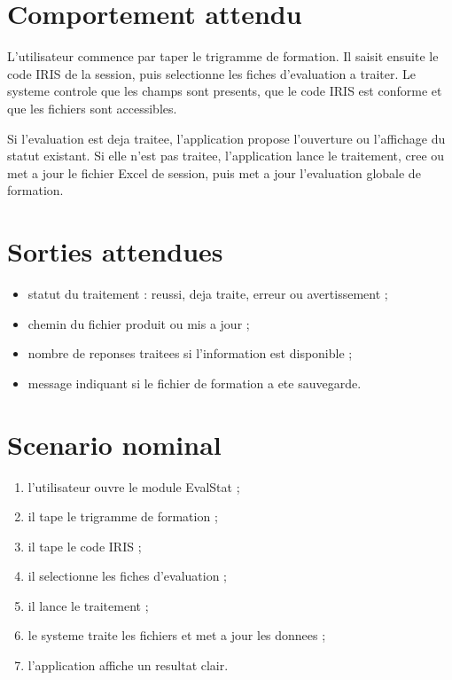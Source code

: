 \documentclass[11pt,a4paper]{report}
\begin{document}
\section{Comportement attendu}

L'utilisateur commence par taper le trigramme de formation. Il saisit ensuite le code IRIS de la session, puis selectionne les fiches d'evaluation a traiter. Le systeme controle que les champs sont presents, que le code IRIS est conforme et que les fichiers sont accessibles.

Si l'evaluation est deja traitee, l'application propose l'ouverture ou l'affichage du statut existant. Si elle n'est pas traitee, l'application lance le traitement, cree ou met a jour le fichier Excel de session, puis met a jour l'evaluation globale de formation.

\section{Sorties attendues}

\begin{itemize}
  \item statut du traitement : reussi, deja traite, erreur ou avertissement ;
  \item chemin du fichier produit ou mis a jour ;
  \item nombre de reponses traitees si l'information est disponible ;
  \item message indiquant si le fichier de formation a ete sauvegarde.
\end{itemize}

\section{Scenario nominal}

\begin{enumerate}
  \item l'utilisateur ouvre le module EvalStat ;
  \item il tape le trigramme de formation ;
  \item il tape le code IRIS ;
  \item il selectionne les fiches d'evaluation ;
  \item il lance le traitement ;
  \item le systeme traite les fichiers et met a jour les donnees ;
  \item l'application affiche un resultat clair.
\end{enumerate}
\end{document}
